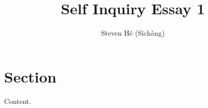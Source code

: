 \documentclass{article}
\title{Self Inquiry Essay 1}
\author{Steven Hé (Sīchàng)}
\begin{document}
\maketitle
\section{Section}
Content.
\end{document}
